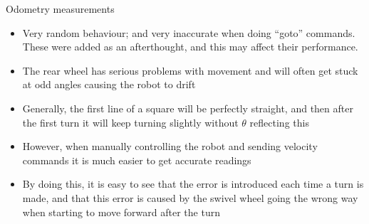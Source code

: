 \documentclass[12pt]{beamer}
\begin{document}
\begin{frame}{Odometry measurements}
  \begin{itemize}
  \item<+-> Very random behaviour; and very inaccurate when doing ``goto'' commands. These were added as an afterthought, and this may affect their performance.
  \item<+-> The rear wheel has serious problems with movement and will often get stuck at odd angles causing the robot to drift
  \item<+-> Generally, the first line of a square will be perfectly straight, and then after the first turn it will keep turning slightly without $\theta$ reflecting this
  \item<+-> However, when manually controlling the robot and sending velocity commands it is much easier to get accurate readings
    \item<+-> By doing this, it is easy to see that the error is introduced each time a turn is made, and that this error is caused by the swivel wheel going the wrong way when starting to move forward after the turn
  \end{itemize}
\end{frame}
{ \smaller
  
  }
\end{document}
